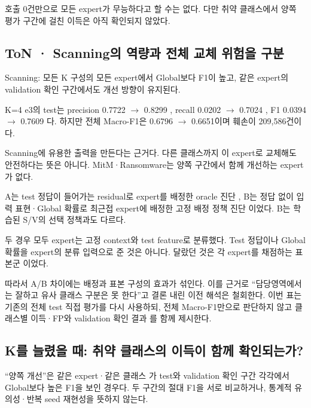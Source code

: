호출 0건만으로 모든 expert가 무능하다고 할 수는 없다. 다만 취약 클래스에서 양쪽 평가 구간에 걸친 이득은 아직 확인되지 않았다.

\subsection*{ToN · Scanning의 역량과 전체 교체 위험을 구분}
Scanning: 모든 K 구성의 모든 expert에서 Global보다 F1이 높고, 같은 expert의 validation 확인 구간에서도 개선 방향이 유지된다.

K=\allowbreak{}4 e3의 test는 precision 0.7722  \ensuremath{\rightarrow}  0.8299 , recall 0.0202  \ensuremath{\rightarrow}  0.7024 , F1 0.0394  \ensuremath{\rightarrow}  0.7609 다. 하지만 전체 Macro-F1은 0.6796  \ensuremath{\rightarrow}  0.6651이며 훼손이 209,586건이다.

Scanning에 유용한 출력을 만든다는 근거다. 다른 클래스까지 이 expert로 교체해도 안전하다는 뜻은 아니다. MitM·Ransomware는 양쪽 구간에서 함께 개선하는 expert가 없다.

A는 test 정답이 들어가는 residual로 expert를 배정한 oracle 진단 , B는 정답 없이 입력 표현·Global 확률로 최근접 expert에 배정한 고정 배정 정책 진단 이었다. B는 학습된 S/\allowbreak{}V의 선택 정책과도 다르다.

두 경우 모두 expert는 고정 context와 test feature로 분류했다. Test 정답이나 Global 확률을 expert의 분류 입력으로 준 것은 아니다. 달랐던 것은 각 expert를 채점하는 표본군 이었다.

따라서 A/\allowbreak{}B 차이에는 배정과 표본 구성의 효과가 섞인다. 이를 근거로 “담당영역에서는 잘하고 유사 클래스 구분은 못 한다”고 결론 내린 이전 해석은 철회한다. 이번 표는 기존의 전체 test 직접 평가를 다시 사용하되, 전체 Macro-F1만으로 판단하지 않고 클래스별 이득·FP와 validation 확인 결과 를 함께 제시한다.

\subsection*{K를 늘렸을 때: 취약 클래스의 이득이 함께 확인되는가?}
“양쪽 개선”은 같은 expert·같은 클래스 가 test와 validation 확인 구간 각각에서 Global보다 높은 F1을 보인 경우다. 두 구간의 절대 F1을 서로 비교하거나, 통계적 유의성·반복 seed 재현성을 뜻하지 않는다.

